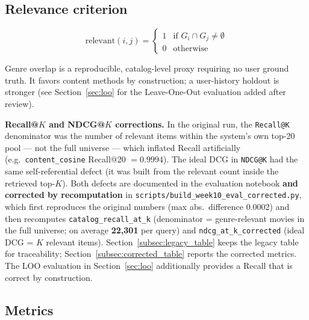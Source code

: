 \documentclass[12pt,a4paper]{article}
\begin{document}
\subsection{Relevance criterion}
\label{subsec:relevance}

\begin{equation}
  \text{relevant}(i, j) =
  \begin{cases}
    1 & \text{if } G_i \cap G_j \neq \emptyset \\
    0 & \text{otherwise}
  \end{cases}
\end{equation}

Genre overlap is a reproducible, catalog-level proxy requiring no user ground truth.
It favors content methods by construction; a user-history holdout is stronger
(see Section~\ref{sec:loo} for the Leave-One-Out evaluation added after review).

\textbf{Recall@$K$ and NDCG@$K$ corrections.}
In the original run, the \texttt{Recall@K} denominator was the number of relevant items
within the system's own top-20 pool --- not the full universe --- which inflated Recall
artificially (e.g.\ \texttt{content\_cosine} Recall@20 $= 0.9994$). The ideal DCG in
\texttt{NDCG@K} had the same self-referential defect (it was built from the relevant count
inside the retrieved top-$K$). Both defects are documented in the evaluation notebook
\textbf{and corrected by recomputation} in \texttt{scripts/build\_week10\_eval\_corrected.py},
which first reproduces the original numbers (max abs.\ difference 0.0002) and then recomputes
\texttt{catalog\_recall\_at\_k} (denominator = genre-relevant movies in the full universe;
on average \textbf{22,301} per query) and \texttt{ndcg\_at\_k\_corrected} (ideal DCG = $K$
relevant items). Section~\ref{subsec:legacy_table} keeps the legacy table for traceability;
Section~\ref{subsec:corrected_table} reports the corrected metrics. The LOO evaluation in
Section~\ref{sec:loo} additionally provides a Recall that is correct by construction.

\subsection{Metrics}
\label{subsec:metrics}
\end{document}
